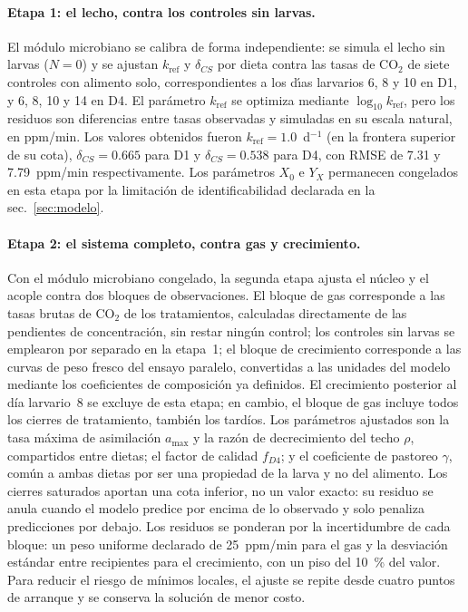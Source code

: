 \paragraph{Etapa 1: el lecho, contra los controles sin larvas.}
El m\'{o}dulo microbiano se calibra de forma independiente: se simula el lecho sin larvas ($N = 0$) y se ajustan $k_{\mathrm{ref}}$ y $\delta_{CS}$ por dieta contra las tasas de CO$_2$ de siete controles con alimento solo, correspondientes a los d\'{\i}as larvarios 6, 8 y 10 en D1, y 6, 8, 10 y 14 en D4. El par\'{a}metro $k_{\mathrm{ref}}$ se optimiza mediante $\log_{10} k_{\mathrm{ref}}$, pero los residuos son diferencias entre tasas observadas y simuladas en su escala natural, en ppm/min. Los valores obtenidos fueron $k_{\mathrm{ref}} = 1.0$~d$^{-1}$ (en la frontera superior de su cota), $\delta_{CS} = 0.665$ para D1 y $\delta_{CS} = 0.538$ para D4, con RMSE de 7.31 y 7.79~ppm/min respectivamente. Los par\'{a}metros $X_0$ e $Y_X$ permanecen congelados en esta etapa por la limitaci\'{o}n de identificabilidad declarada en la sec.~\ref{sec:modelo}.

\paragraph{Etapa 2: el sistema completo, contra gas y crecimiento.}
Con el módulo microbiano congelado, la segunda etapa ajusta el núcleo y el acople contra dos bloques de observaciones. El bloque de gas corresponde a las tasas brutas de CO$_2$ de los tratamientos, calculadas directamente de las pendientes de concentración, sin restar ningún control; los controles sin larvas se emplearon por separado en la etapa~1; el bloque de crecimiento corresponde a las curvas de peso fresco del ensayo paralelo, convertidas a las unidades del modelo mediante los coeficientes de composición ya definidos. El crecimiento posterior al día larvario~8 se excluye de esta etapa; en cambio, el bloque de gas incluye todos los cierres de tratamiento, también los tardíos. Los parámetros ajustados son la tasa máxima de asimilación $a_{\max}$ y la razón de decrecimiento del techo $\rho$, compartidos entre dietas; el factor de calidad $f_{D4}$; y el coeficiente de pastoreo $\gamma$, común a ambas dietas por ser una propiedad de la larva y no del alimento. Los cierres saturados aportan una cota inferior, no un valor exacto: su residuo se anula cuando el modelo predice por encima de lo observado y solo penaliza predicciones por debajo. Los residuos se ponderan por la incertidumbre de cada bloque: un peso uniforme declarado de 25~ppm/min para el gas y la desviación estándar entre recipientes para el crecimiento, con un piso del 10~\% del valor. Para reducir el riesgo de mínimos locales, el ajuste se repite desde cuatro puntos de arranque y se conserva la solución de menor costo.

